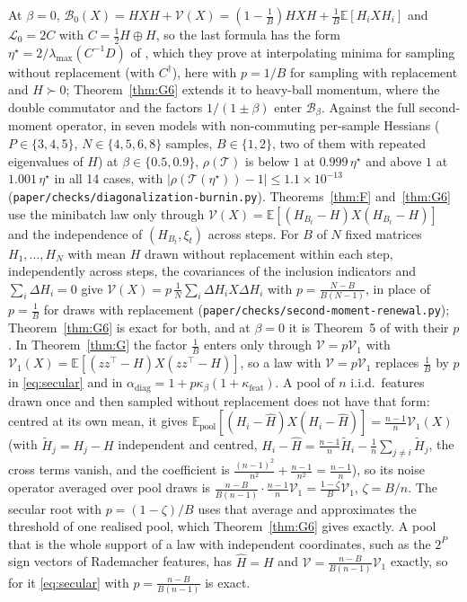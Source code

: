 \documentclass[11pt]{article}
\theoremstyle{remark}
\newcommand{\E}{\mathbb{E}}
\begin{document}
At $\beta=0$, $\mathcal B_0(X)=HXH+\mathcal V(X)=(1-\frac1B)HXH+\frac1B\E[H_iXH_i]$ and $\mathcal L_0=2C$ with $C=\frac12H\oplus H$, so the last formula has the form $\eta^\star=2/\lambda_{\max}(C^{-1}D)$ of \citet[Theorem~5]{mulayoff2024exact}, which they prove at interpolating minima for sampling without replacement (with $C^\dagger$), here with $p=1/B$ for sampling with replacement and $H\succ0$; Theorem~\ref{thm:G6} extends it to heavy-ball momentum, where the double commutator and the factors $1/(1\pm\beta)$ enter $\mathcal B_\beta$. Against the full second-moment operator, in seven models with non-commuting per-sample Hessians ($P\in\{3,4,5\}$, $N\in\{4,5,6,8\}$ samples, $B\in\{1,2\}$, two of them with repeated eigenvalues of $H$) at $\beta\in\{0.5,0.9\}$, $\rho(\mathcal T)$ is below $1$ at $0.999\,\eta^\star$ and above $1$ at $1.001\,\eta^\star$ in all 14 cases, with $|\rho(\mathcal T(\eta^\star))-1|\le1.1\times10^{-13}$ (\texttt{paper/checks/diagonalization-burnin.py}). Theorems~\ref{thm:F} and~\ref{thm:G6} use the minibatch law only through $\mathcal V(X)=\E[(H_{B_t}-H)X(H_{B_t}-H)]$ and the independence of $(H_{B_t},\xi_t)$ across steps. For $B$ of $N$ fixed matrices $H_1,\dots,H_N$ with mean $H$ drawn without replacement within each step, independently across steps, the covariances of the inclusion indicators and $\sum_i\Delta H_i=0$ give $\mathcal V(X)=p\,\frac1N\sum_i\Delta H_iX\Delta H_i$ with $p=\frac{N-B}{B(N-1)}$, in place of $p=\frac1B$ for draws with replacement (\texttt{paper/checks/second-moment-renewal.py}); Theorem~\ref{thm:G6} is exact for both, and at $\beta=0$ it is Theorem~5 of \citet{mulayoff2024exact} with their $p$. In Theorem~\ref{thm:G} the factor $\frac1B$ enters only through $\mathcal V=p\mathcal V_1$ with $\mathcal V_1(X)=\E[(zz^\top-H)X(zz^\top-H)]$, so a law with $\mathcal V=p\mathcal V_1$ replaces $\frac1B$ by $p$ in \eqref{eq:secular} and in $\alpha_{\mathrm{diag}}=1+p\kappa_\beta(1+\kappa_{\mathrm{feat}})$. A pool of $n$ i.i.d.\ features drawn once and then sampled without replacement does not have that form: centred at its own mean, it gives $\E_{\mathrm{pool}}[(H_i-\hat H)X(H_i-\hat H)]=\frac{n-1}n\mathcal V_1(X)$ (with $\tilde H_j=H_j-H$ independent and centred, $H_i-\hat H=\frac{n-1}n\tilde H_i-\frac1n\sum_{j\ne i}\tilde H_j$, the cross terms vanish, and the coefficient is $\frac{(n-1)^2}{n^2}+\frac{n-1}{n^2}=\frac{n-1}n$), so its noise operator averaged over pool draws is $\frac{n-B}{B(n-1)}\cdot\frac{n-1}n\mathcal V_1=\frac{1-\zeta}B\mathcal V_1$, $\zeta=B/n$. The secular root with $p=(1-\zeta)/B$ uses that average and approximates the threshold of one realised pool, which Theorem~\ref{thm:G6} gives exactly. A pool that is the whole support of a law with independent coordinates, such as the $2^P$ sign vectors of Rademacher features, has $\hat H=H$ and $\mathcal V=\frac{n-B}{B(n-1)}\mathcal V_1$ exactly, so for it \eqref{eq:secular} with $p=\frac{n-B}{B(n-1)}$ is exact.
\end{document}
